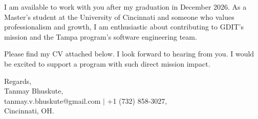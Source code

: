 \documentclass[11pt]{letter}
\begin{document}
\begin{letter}{}
I am available to work with you after my graduation in December 2026. As a Master's student at the University of Cincinnati and someone who values professionalism and growth, I am enthusiastic about contributing to GDIT's mission and the Tampa program's software engineering team.

Please find my CV attached below. I look forward to hearing from you. I would be excited to support a program with such direct mission impact.

{\setlength{\parskip}{0pt}
Regards,\\
Tanmay Bhuskute,\\
tanmay.v.bhuskute@gmail.com $\mid$ +1 (732) 858-3027,\\
Cincinnati, OH.
}

\end{letter}
\end{document}
